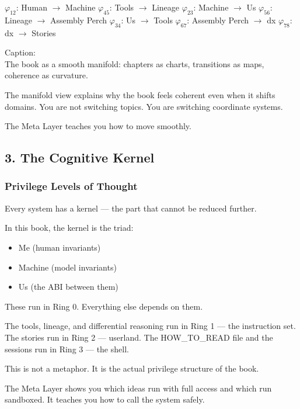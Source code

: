 \(\varphi_{12}\): Human \(\to\) Machine \(\varphi_{45}\): Tools \(\to\)
Lineage \(\varphi_{23}\): Machine \(\to\) Us \(\varphi_{56}\): Lineage
\(\to\) Assembly Perch \(\varphi_{34}\): Us \(\to\) Tools
\(\varphi_{67}\): Assembly Perch \(\to\) dx \(\varphi_{78}\): dx \(\to\)
Stories

Caption:\\
The book as a smooth manifold: chapters as charts, transitions as maps,
coherence as curvature.

The manifold view explains why the book feels coherent even when it
shifts domains. You are not switching topics. You are switching
coordinate systems.

The Meta Layer teaches you how to move smoothly.

\hypertarget{the-cognitive-kernel}{%
\subsection{3. The Cognitive Kernel}\label{the-cognitive-kernel}}

\hypertarget{privilege-levels-of-thought}{%
\subsubsection{Privilege Levels of
Thought}\label{privilege-levels-of-thought}}

Every system has a kernel --- the part that cannot be reduced further.

In this book, the kernel is the triad:

\begin{itemize}
\tightlist
\item
  Me (human invariants)
\item
  Machine (model invariants)
\item
  Us (the ABI between them)
\end{itemize}

These run in Ring 0. Everything else depends on them.

The tools, lineage, and differential reasoning run in Ring 1 --- the
instruction set. The stories run in Ring 2 --- userland. The
HOW\_TO\_READ file and the sessions run in Ring 3 --- the shell.

This is not a metaphor. It is the actual privilege structure of the
book.

The Meta Layer shows you which ideas run with full access and which run
sandboxed. It teaches you how to call the system safely.

